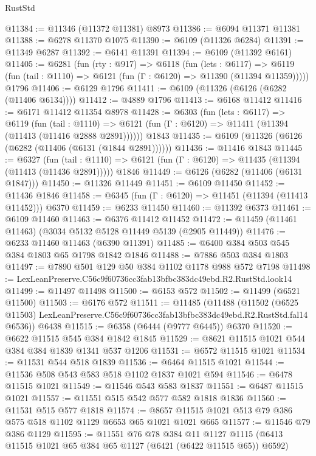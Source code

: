 \begin{lexlean}{RustStd}
\begin{coremodule}
@11384 := @11346 (@11372 @11381) @8973
@11386 := @6094 @11371 @11381
@11388 := @6278 @11370 @1075
@11390 := @6109 (@11326 @6284)
@11391 := @11349 @6287
@11392 := @6141 @11391
@11394 := @6109 (@11392 @6161)
@11405 := @6281
    (fun (rty : @917) =>
    @6118
      (fun (lets : @6117) =>
      @6119 (fun (tail : @1110) => @6121 (fun (Γ : @6120) => @11390 (@11394 @11359)))))
    @1796
@11406 := @6129 @1796
@11411 := @6109 (@11326 (@6126 (@6282 (@11406 @6134))))
@11412 := @4889 @1796
@11413 := @6168 @11412
@11416 := @6171 @11412 @11354 @8978
@11428 := @6303
    (fun (lets : @6117) =>
    @6119
      (fun (tail : @1110) =>
      @6121 (fun (Γ : @6120) => @11411 (@11394 (@11413 (@11416 @2888 @2891))))))
    @1843
@11435 := @6109 (@11326 (@6126 (@6282 (@11406 (@6131 (@1844 @2891))))))
@11436 := @11416 @1843
@11445 := @6327
    (fun (tail : @1110) => @6121 (fun (Γ : @6120) => @11435 (@11394 (@11413 (@11436 @2891)))))
    @1846
@11449 := @6126 (@6282 (@11406 (@6131 @1847)))
@11450 := @11326 @11449
@11451 := @6109 @11450
@11452 := @11436 @1846
@11458 := @6345 (fun (Γ : @6120) => @11451 (@11394 (@11413 @11452))) @6370
@11459 := @6233 @11450
@11460 := @11392 @6373
@11461 := @6109 @11460
@11463 := @6376 @11412 @11452
@11472 := @11459 (@11461 @11463) (@3034 @5132 @5128 @11449 @5139 (@2905 @11449))
@11476 := @6233 @11460 @11463 (@6390 @11391)
@11485 := @6400 @384 @503 @545 @384 @1803 @65 @1798 @1842 @1846
@11488 := @7886 @503 @384 @1803
@11497 := @7890 @501 @129 @50 @384 @1102 @1178 @988 @572 @7198
@11498 := LexLeanPreserve.C56c9f60736cc3fab13bfbc383dc49ebd.R2.RustStd.look14
@11499 := @11497 @11498
@11500 := @6153 @572
@11502 := @11499 (@6521 @11500)
@11503 := @6176 @572
@11511 := @11485
    (@11488
      (@11502
        (@6525 @11503)
        LexLeanPreserve.C56c9f60736cc3fab13bfbc383dc49ebd.R2.RustStd.fal14
        @6536))
    @6438
@11515 := @6358 (@6444 (@9777 @6445)) @6370
@11520 := @6622 @11515 @545 @384 @1842 @1845
@11529 := @8621 @11515 @1021 @544 @384 @384 @1839 @1341 @537 @1206
@11531 := @6572 @11515 @1021
@11534 := @11531 @544 @518 @1839
@11536 := @6464 @11515 @1021
@11544 := @11536 @508 @543 @583 @518 @1102 @1837 @1021 @594
@11546 := @6478 @11515 @1021
@11549 := @11546 @543 @583 @1837
@11551 := @6487 @11515 @1021
@11557 := @11551 @515 @542 @577 @582 @1818 @1836
@11560 := @11531 @515 @577 @1818
@11574 := @8657 @11515 @1021 @513 @79 @386 @575 @518 @1102 @1129 @6653 @65 @1021 @1021 @665
@11577 := @11546 @79 @386 @1129
@11595 := @11551
    @76
    @78
    @384
    @11
    @1127
    @1115
    (@6413 @11515 @1021 @65 @384 @65 @1127 (@6421 (@6422 @11515 @65)) @6592)

\end{coremodule}
\end{lexlean}
